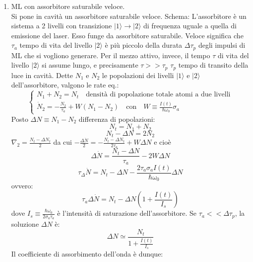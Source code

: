 \documentclass{book}
\def \N {\nabla}
\def \D {\Delta}
\def \s {\sigma}
\newcommand{\lv}[1]{$|#1\rangle$}
\newcommand{\lve}[1]{|#1\rangle}
\theoremstyle{remark}
\begin{document}
\begin{enumerate}
\item ML con assorbitore saturabile veloce.\\
Si pone in cavità un assorbitore saturabile veloce.
Schema:
L'assorbitore è un sistema a 2 livelli con transizione $\lve{1} \rightarrow \lve{2}$ di frequenza uguale a quella di emissione del laser. Esso funge da assorbitore saturabile. Veloce significa che $\tau_a$ tempo di vita del livello \lv{2} è più piccolo della durata $\D\tau_p$ degli impulsi di ML che si vogliono generare. Per il mezzo attivo, invece, il tempo $\tau$ di vita del livello \lv{2} si assume lungo, e precisamente $\tau >> \tau_p$ $\tau_p$ tempo di transito della luce in cavità. Dette $N_1$ e $N_2$ le popolazioni dei livelli \lv{1} e \lv{2} dell'assorbitore, valgono le rate eq.:
\begin{equation*}
\begin{cases}
N_1 + N_2 = N_t \quad \text{densità di popolazione totale atomi a due livelli}\\
\dot{N}_2 = - \frac{N_2}{\tau_a} + W (N_1 - N_2) \quad \text{con} \quad W \equiv \frac{I(t)}{\hbar \omega_0} \s_a
\end{cases}
\end{equation*}
Posto $\D N \equiv N_1 -N_2$ differenza di popolazioni:
\begin{equation*}
N_t = N_1 + N_2
\end{equation*}
\begin{equation*}
N_t - \D N = 2N_2
\end{equation*}
$\N_2 = \frac{N_t - \D N_t}{2}$ da cui $-\frac{\D\dot{N}}{2} = -\frac{N_t - \D N_t}{2\tau_a} + W\D N$ e cioè
\begin{equation*}
\D\dot{N} = \frac{N_t - \D N}{\tau_a} - 2W\D N
\end{equation*}
\begin{equation*}
\tau_\D\dot{N} = N_t - \D N - \frac{2\tau_a \s_a I(t)}{\hbar \omega_0} \D N
\end{equation*}
ovvero:
\begin{equation*}
\tau_a \D \dot{N} = N_t - \D N \left(1 + \frac{I(t)}{I_s}\right)
\end{equation*}
dove $I_s \equiv \frac{\hbar\omega_0}{2\s_a\tau_a}$ è l'intensità di saturazione dell'assorbitore. Se $\tau_a << \D\tau_p$, la soluzione $\D N$ è:
\begin{equation*}
\D N \simeq \frac{N_t}{1 + \frac{I(t)}{I_s}}
\end{equation*}
Il coefficiente di assorbimento dell'onda è dunque:
\begin{equation*}

\end{equation*}
\end{enumerate}
\end{document}
